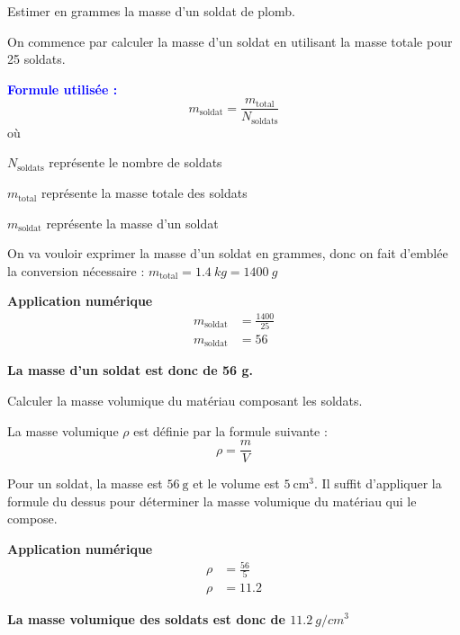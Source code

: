 \documentclass[answers]{exam}
\begin{document}
\begin{questions}
  \question[1] Estimer en grammes la masse d'un soldat de plomb.
  \begin{solution}
  
    On commence par calculer la masse d'un soldat en utilisant la masse totale pour 25 soldats.

    \textcolor{blue}{\textbf{Formule utilisée :}}
    \[
    m_{\text{soldat}} = \frac{m_{\text{total}}}{N_{\text{soldats}}}
    \]
    où
    \begin{addmargin}[4em]{1em}
      \begin{compactitem}
          \item [$N_{\text{soldats}}$] représente le nombre de soldats
          \item [$m_{\text{total}}$] représente la masse totale des soldats
          \item [$m_{\text{soldat}}$] représente la  masse d'un soldat
      \end{compactitem}
      \end{addmargin}

  On va vouloir exprimer la masse d'un soldat en grammes, donc on fait d'emblée la conversion nécessaire : $m_{\text{total}} = \SI{1.4}{kg} = \SI{1400}{g}$

  \textbf{Application numérique}
    \begin{align*}
      m_{\text{soldat}} &= \frac{1400}{25} \\
      m_{\text{soldat}} &= 56
    \end{align*}

    \textbf{La masse d'un soldat est donc de 56 g.}
  \end{solution}
  \question[1] Calculer la masse volumique du matériau composant les soldats.
  \begin{solution}
    La masse volumique \( \rho \) est définie par la formule suivante :
    \[
    \rho = \frac{m}{V}
    \]

    Pour un soldat, la masse est \( 56 \ \text{g} \) et le volume est \( 5 \ \text{cm}^3 \). Il suffit d'appliquer la formule du dessus pour déterminer la masse volumique du matériau qui le compose.

    \textbf{Application numérique}
    \begin{align*}
      \rho &= \frac{56}{5} \\
      \rho &= 11.2
    \end{align*}

  \textbf{La masse volumique des soldats est donc de $\SI{11.2}{g/cm^3}$}
  \end{solution}


\end{questions}
\end{document}
